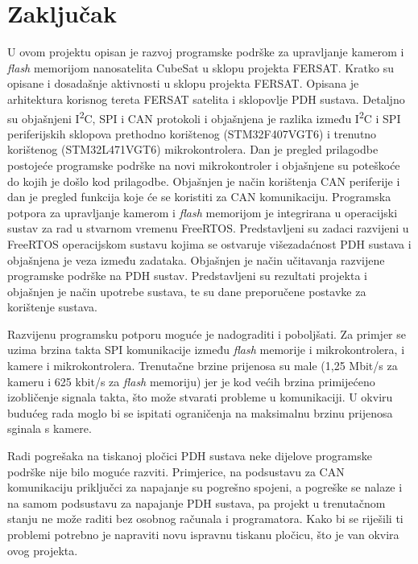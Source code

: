 \chapter{Zaključak}

U ovom projektu opisan je razvoj programske podrške za 
upravljanje kamerom i \textit{flash} memorijom nanosatelita 
CubeSat u sklopu projekta FERSAT. Kratko su opisane i dosadašnje
 aktivnosti u sklopu projekta FERSAT. Opisana je arhitektura korisnog
 tereta FERSAT satelita i sklopovlje PDH sustava. 
 Detaljno su objašnjeni I\textsuperscript{2}C, SPI i 
 CAN protokoli i objašnjena je razlika između 
 I\textsuperscript{2}C i SPI periferijskih sklopova prethodno 
 korištenog (STM32F407VGT6) i trenutno korištenog (STM32L471VGT6) 
 mikrokontrolera. Dan je pregled prilagodbe postojeće programske podrške na novi mikrokontroler i 
 objašnjene su poteškoće do kojih je došlo kod prilagodbe. Objašnjen je način korištenja CAN periferije i dan je pregled 
 funkcija koje će se koristiti za CAN komunikaciju. 
 Programska potpora za upravljanje kamerom i 
 \textit{flash} memorijom je integrirana u operacijski sustav 
 za rad u stvarnom vremenu FreeRTOS. 
 Predstavljeni su zadaci razvijeni u FreeRTOS operacijskom 
 sustavu kojima se ostvaruje višezadaćnost PDH sustava i 
 objašnjena je veza između zadataka. Objašnjen je način 
 učitavanja razvijene programske podrške na PDH sustav. 
 Predstavljeni su rezultati projekta i objašnjen je način 
 upotrebe sustava, te su dane preporučene postavke za 
 korištenje sustava.

Razvijenu programsku potporu moguće je nadograditi i poboljšati. 
Za primjer se uzima brzina takta SPI komunikacije između \textit{flash} memorije i mikrokontrolera, i kamere i mikrokontrolera. %
 Trenutačne brzine prijenosa su male (1,25 Mbit/s za kameru i 625 kbit/s za \textit{flash} memoriju) 
 jer je kod većih brzina primijećeno izobličenje signala takta, što može stvarati probleme u komunikaciji. 
U okviru budućeg rada moglo bi se ispitati ograničenja na maksimalnu 
brzinu prijenosa sginala s kamere.

Radi pogrešaka na tiskanoj pločici PDH sustava neke dijelove programske podrške nije bilo moguće razviti. 
Primjerice, na podsustavu za CAN komunikaciju priključci
za napajanje su pogrešno spojeni, a pogreške se nalaze 
i na samom podsustavu za napajanje PDH sustava, 
pa projekt u trenutačnom stanju ne može raditi bez 
osobnog računala i programatora. 
Kako bi se riješili ti problemi potrebno je napraviti novu 
ispravnu tiskanu pločicu, što je van okvira ovog projekta.
